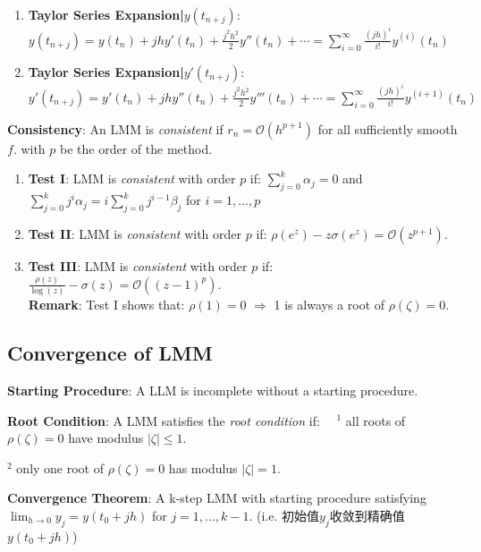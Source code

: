 \documentclass[9pt]{article}
\begin{document}
\begin{enumerate}[itemsep=-2pt, topsep=-2pt]
    \item \textbf{Taylor Series Expansion|$y(t_{n+j})$}: $y(t_{n+j})=y(t_n)+jhy'(t_n)+\frac{j^2h^2}{2}y''(t_n)+\cdots=\sum_{i=0}^{\infty}\frac{(jh)^i}{i!}y^{(i)}(t_n)$
    \item \textbf{Taylor Series Expansion|$y'(t_{n+j})$}: $y'(t_{n+j})=y'(t_n)+jhy''(t_n)+\frac{j^2h^2}{2}y'''(t_n)+\cdots=\sum_{i=0}^{\infty}\frac{(jh)^i}{i!}y^{(i+1)}(t_n)$
\end{enumerate}

\textbf{Consistency}: An LMM is \textit{consistent} if $r_n=\mathcal{O}(h^{p+1})$ for all sufficiently smooth $f$. \quad with $p$ be the order of the method.

\begin{enumerate}[itemsep=-2pt, topsep=-2pt]
    \item \textbf{Test I}: LMM is \textit{consistent} with order $p$ if: $\sum_{j=0}^{k}\alpha_j=0$ and $\sum_{j=0}^{k}j^i\alpha_j=i\sum_{j=0}^{k}j^{i-1}\beta_j$ for $i=1,...,p$
    \item \textbf{Test II}: LMM is \textit{consistent} with order $p$ if: $\rho(e^{z})-z\sigma(e^{z})=\mathcal{O}(z^{p+1})$.
    \item \textbf{Test III}: LMM is \textit{consistent} with order $p$ if: $\frac{\rho(z)}{\log(z)}-\sigma(z)=\mathcal{O}((z-1)^p)$. \\
    \textbf{Remark}: Test I shows that: $\rho(1)=0$ $\Rightarrow$ 1 is always a root of $\rho(\zeta)=0$.
\end{enumerate}


\subsection{Convergence of LMM} %

\textbf{Starting Procedure}: A LLM is incomplete without a starting procedure. 

\textbf{Root Condition}: A LMM satisfies the \textit{root condition} if: \ \ $^1$ all roots of $\rho(\zeta)=0$ have modulus $|\zeta|\leq1$. 

\hspace{235pt} $^2$ only one root of $\rho(\zeta)=0$ has modulus $|\zeta|=1$.

\textbf{Convergence Theorem}: {\small A k-step LMM with starting procedure satisfying $\lim_{h\to0}y_j=y(t_0+jh)$ for $j=1,...,k-1$. {\tiny (i.e. 初始值$y_j$收敛到精确值$y(t_0+jh)$)}}
\end{document}
